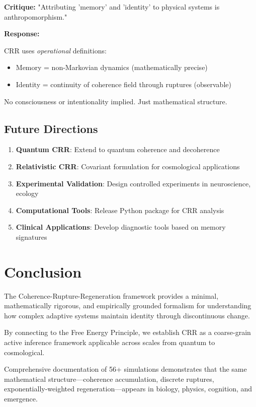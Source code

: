\documentclass[11pt,a4paper]{article}
\theoremstyle{definition}
\theoremstyle{remark}
\begin{document}
\textbf{Critique:} "Attributing 'memory' and 'identity' to physical systems is anthropomorphism."

\textbf{Response:}

CRR uses \emph{operational} definitions:
\begin{itemize}
\item Memory = non-Markovian dynamics (mathematically precise)
\item Identity = continuity of coherence field through ruptures (observable)
\end{itemize}

No consciousness or intentionality implied. Just mathematical structure.

\subsection{Future Directions}

\begin{enumerate}
\item \textbf{Quantum CRR}: Extend to quantum coherence and decoherence
\item \textbf{Relativistic CRR}: Covariant formulation for cosmological applications
\item \textbf{Experimental Validation}: Design controlled experiments in neuroscience, ecology
\item \textbf{Computational Tools}: Release Python package for CRR analysis
\item \textbf{Clinical Applications}: Develop diagnostic tools based on memory signatures
\end{enumerate}

\section{Conclusion}

The Coherence-Rupture-Regeneration framework provides a minimal, mathematically rigorous, and empirically grounded formalism for understanding how complex adaptive systems maintain identity through discontinuous change.

By connecting to the Free Energy Principle, we establish CRR as a coarse-grain active inference framework applicable across scales from quantum to cosmological.

Comprehensive documentation of 56+ simulations demonstrates that the same mathematical structure—coherence accumulation, discrete ruptures, exponentially-weighted regeneration—appears in biology, physics, cognition, and emergence.
\end{document}
